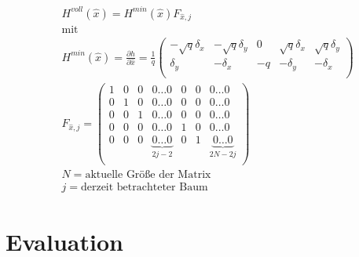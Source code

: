 \documentclass[11pt]{article}
\begin{document}
\begin{equation}\label{SLAM-Observation-Model-Jakobi-Matrix}
\begin{split}
	&H^{voll}(\hat{x}) = H^{min}(\hat{x})F_{\hat{x},j} \\
	&\text{mit} \\
	&H^{min}(\hat{x}) = \frac{\partial h}{\partial \hat{x}} = \frac{1}{q} \begin{pmatrix}
		-\sqrt{q}\delta_x & -\sqrt{q}\delta_y & 0 & \sqrt{q}\delta_x & \sqrt{q}\delta_y \\
		\delta_y & -\delta_x & -q & -\delta_y & -\delta_x\\
	\end{pmatrix} \\
	&F_{\hat{x},j} = \begin{pmatrix}
		1 & 0 & 0 & 0 \dots 0 & 0 & 0 & 0 \dots 0 \\
		0 & 1 & 0 & 0 \dots 0 & 0 & 0 & 0 \dots 0 \\
		0 & 0 & 1 & 0 \dots 0 & 0 & 0 & 0 \dots 0 \\
		0 & 0 & 0 & 0 \dots 0 & 1 & 0 & 0 \dots 0 \\
		0 & 0 & 0 & \underbrace{0 \dots 0}_{2j-2} & 0 & 1 & \underbrace{0 \dots 0}_{2N-2j} \\
	\end{pmatrix} \\
	&N= \text{aktuelle Größe der Matrix} \\
	&j= \text{derzeit betrachteter Baum}
\end{split}
\end{equation}

\section{Evaluation}\label{Evaluation}
\end{document}

